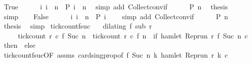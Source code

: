 \begin{isabellebody}
\ True\isanewline
\ \ \ \ \isamarkupfalse%
\ {\isacartoucheopen}{\isacharbraceleft}i{\isachardot}\ i\ {\isacharequal}\ n\ {\isasymand}\ P\ i{\isacharbraceright}\ {\isacharequal}\ {\isacharbraceleft}n{\isacharbraceright}{\isacartoucheclose}\ \isamarkupfalse%
\ {\isacharparenleft}simp\ add{\isacharcolon}\ Collect{\isacharunderscore}conv{\isacharunderscore}if{\isacharparenright}\isanewline
\ \ \ \ \isamarkupfalse%
\ {\isacartoucheopen}P\ n{\isacartoucheclose}\ \isamarkupfalse%
\ {\isacharquery}thesis\ \isamarkupfalse%
\ simp\isanewline
{}\isamarkupfalse%
\isanewline
\ \ \isamarkupfalse%
\ False\isanewline
\ \ \ \ \isamarkupfalse%
\ {\isacartoucheopen}{\isacharbraceleft}i{\isachardot}\ i\ {\isacharequal}\ n\ {\isasymand}\ P\ i{\isacharbraceright}\ {\isacharequal}\ {\isacharbraceleft}{\isacharbraceright}{\isacartoucheclose}\ \isamarkupfalse%
\ {\isacharparenleft}simp\ add{\isacharcolon}\ Collect{\isacharunderscore}conv{\isacharunderscore}if{\isacharparenright}\isanewline
\ \ \ \ \isamarkupfalse%
\ {\isacartoucheopen}{\isasymnot}P\ n{\isacartoucheclose}\ \isamarkupfalse%
\ {\isacharquery}thesis\ \isamarkupfalse%
\ simp\isanewline
{}\isamarkupfalse%
%
\endisatagproof
{\isafoldproof}%
%
\isadelimproof
\isanewline
%
\endisadelimproof
\isanewline
{}\isamarkupfalse%
\ tick{\isacharunderscore}count{\isacharunderscore}f{\isacharunderscore}suc{\isacharcolon}\isanewline
\ \ \ {\isacartoucheopen}dilating\ f\ sub\ r{\isacartoucheclose}\isanewline
\ \ \ \ \ {\isacartoucheopen}tick{\isacharunderscore}count\ r\ c\ {\isacharparenleft}f\ {\isacharparenleft}Suc\ n{\isacharparenright}{\isacharparenright}\ {\isacharequal}\ tick{\isacharunderscore}count\ r\ c\ {\isacharparenleft}f\ n{\isacharparenright}\ {\isacharplus}\ {\isacharparenleft}if\ hamlet\ {\isacharparenleft}{\isacharparenleft}Rep{\isacharunderscore}run\ r{\isacharparenright}\ {\isacharparenleft}f\ {\isacharparenleft}Suc\ n{\isacharparenright}{\isacharparenright}\ c{\isacharparenright}\ then\ {}\ else\ {}{\isacharparenright}{\isacartoucheclose}\isanewline
%
\isadelimproof
%
\endisadelimproof
%
\isatagproof
{}\isamarkupfalse%
\ tick{\isacharunderscore}count{\isacharunderscore}fsuc{\isacharbrackleft}OF\ assms{\isacharbrackright}\ card{\isacharunderscore}sing{\isacharunderscore}prop{\isacharbrackleft}of\ {\isacartoucheopen}f\ {\isacharparenleft}Suc\ n{\isacharparenright}{\isacartoucheclose}\ {\isacartoucheopen}{\isasymlambda}k{\isachardot}\ hamlet\ {\isacharparenleft}{\isacharparenleft}Rep{\isacharunderscore}run\ r{\isacharparenright}\ k\ c{\isacharparenright}{\isacartoucheclose}{\isacharbrackright}\ \isamarkupfalse%

\end{isabellebody}
